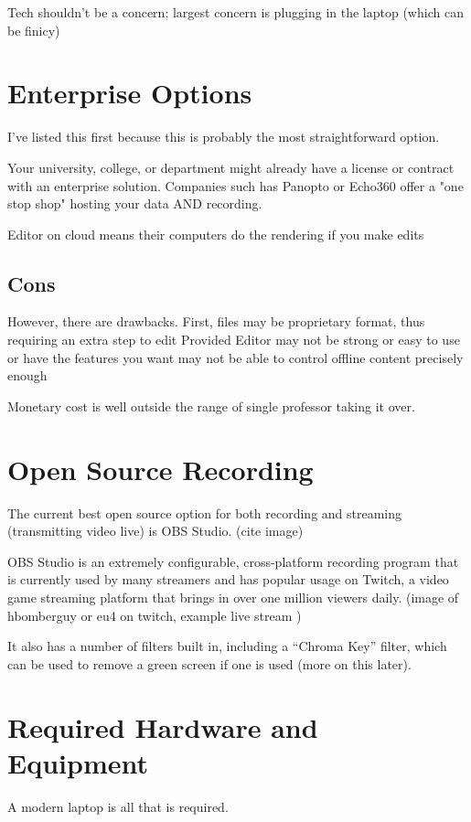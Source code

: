 \documentclass[sigconf]{acmart}
\begin{document}
Tech shouldn't be a concern; largest concern is plugging in the laptop (which can be finicy)

\section{Enterprise Options}
\label{enter}
I've listed this first because this is probably the most straightforward option.

Your university, college, or department might already have a license or contract with an enterprise solution.
Companies such has Panopto or Echo360 offer a "one stop shop" hosting your data AND recording.


Editor on cloud means their computers do the rendering if you make edits

\subsection{Cons}

However, there are drawbacks.
First, files may be proprietary format, thus requiring an extra step to edit
Provided Editor may not be strong or easy to use or have the features you want
may not be able to control offline content precisely enough

Monetary cost is well outside the range of single professor taking it over.

\section{Open Source Recording}
\label{opensource}
The current best open source option for both recording and streaming (transmitting video live) is OBS Studio. (cite image)

OBS Studio is an extremely configurable, cross-platform recording program that is currently used by many streamers and has popular usage on Twitch, a video game streaming platform that brings in over one million viewers daily.  (image of hbomberguy or eu4 on twitch, example live stream )

It also has a number of filters built in, including a  ``Chroma Key'' filter, which can be used to remove a green screen if one is used (more on this later).



\section{Required Hardware and Equipment}
\label{hardware}
A modern laptop is all that is required.
\end{document}
